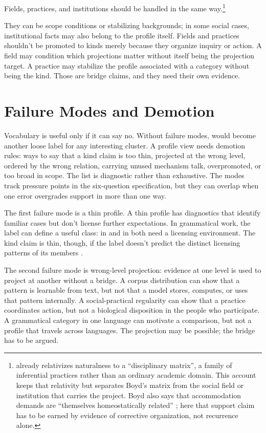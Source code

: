 \documentclass[12pt]{article}
\begin{document}
Fields, practices, and institutions should be handled in the same
way.\footnote{\textcite[148]{boyd1999} already relativizes naturalness to a
\enquote{disciplinary matrix}, a family of inferential practices rather than an
ordinary academic domain. This account keeps that relativity but separates
Boyd's matrix from the social field or institution that carries the project.
Boyd also says that accommodation demands are \enquote{themselves homeostatically
related} \citep[157]{boyd1999}; here that support claim has to be earned by
evidence of corrective organization, not recurrence alone.}

They can be scope conditions or stabilizing backgrounds; in some social cases,
institutional facts may also belong to the profile itself. Fields and practices
shouldn't be promoted to kinds merely because they organize inquiry or action.
A field may condition which projections matter without itself being the
projection target. A practice may stabilize the profile associated with a
category without being the kind. Those are bridge claims, and they need their own
evidence.

\section{Failure Modes and Demotion}

Vocabulary is useful only if it can say no. Without failure modes,
 would become another loose label for any
interesting cluster. A profile view needs demotion rules: ways to say that a
kind claim is too thin, projected at the wrong level, ordered by the wrong
relation, carrying unused mechanism talk, overpromoted, or too broad in scope.
The list is diagnostic rather than exhaustive. The modes track pressure points in
the six-question specification, but they can overlap when one error overgrades
support in more than one way.

The first failure mode is a thin profile. A thin profile has diagnostics that
identify familiar cases but don't license further expectations. In grammatical
work, the label  can define a useful class:
 in  and  in
 both need a licensing environment. The kind
claim is thin, though, if the label doesn't predict the distinct licensing
patterns of its members \citep{hoeksema2012}.

The second failure mode is wrong-level projection: evidence at one level is used
to project at another without a bridge. A corpus distribution can show that a
pattern is learnable from text, but not that a model stores, computes, or uses
that pattern internally. A social-practical regularity can show that a practice
coordinates action, but not a biological disposition in the people who
participate. A grammatical category in one language can motivate a comparison,
but not a profile that travels across languages. The projection may be possible;
the bridge has to be argued.
\end{document}
